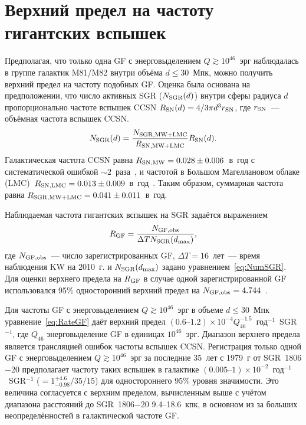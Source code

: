 \section{Верхний предел на частоту гигантских вспышек}\label{GF_rate}
Предполагая, что только одна GF с энерговыделением $Q \gtrsim 10^{46}$~эрг наблюдалась 
в группе галактик M81/M82 внутри объёма $d \le 30$~Мпк, можно получить верхний предел 
на частоту подобных GF. Оценка была основана на предположении, что число активных SGR ($N_{\mathrm{SGR}}(d)$) 
внутри сферы радиуса $d$ пропорционально частоте вспышек CCSN 
$R_{\mathrm{SN}}(d)=4/3 \pi d^3 r_{\mathrm{SN}}$, где $r_{\mathrm{SN}}$~--- объёмная частота вспышек CCSN.
\begin{equation}\label{eq:NumSGR}
N_{{\mathrm{SGR}}} (d) = \frac{N_{{\mathrm{SGR}}, {\mathrm{MW+LMC}}}}{ R_{{\mathrm{SN}}, {\mathrm{MW+LMC}}}} R_{{\mathrm{SN}}}(d).
\end{equation}
Галактическая частота CCSN равна $R_{{\mathrm{SN}}, {\mathrm{MW}}} = 0.028\pm0.006$~в~год 
с систематической ошибкой $\sim 2$~раза~\citep{Li2011part3}, и частотой в Большом 
Магеллановом облаке (LMC)~$R_{{\mathrm{SN}}, {\mathrm{LMC}}} = 0.013\pm0.009$~в~год~\citep{Bergh1991}. 
Таким образом, суммарная частота равна $R_{{\mathrm{SGR}}, {\mathrm{MW+LMC}}} = 0.041\pm0.011$~в~год. 


Наблюдаемая частота гигантских вспышек на SGR задаётся выражением
\begin{equation}\label{eq:RateGF}
R_{{\mathrm{GF}}} = \frac{N_{{\mathrm{GF}},{\mathrm{obs}}}}{\Delta T N_{{\mathrm{SGR}}}(d_{{\mathrm{max}}})} ,
\end{equation}
где $N_{{\mathrm{GF}},{\mathrm{obs}}}$~--- число зарегистрированных GF, 
$\Delta T=16$~лет~--- время наблюдения KW на 2010~г. и $N_{{\mathrm{SGR}}}(d_{{\mathrm{max}}})$ 
задано уравнением~\ref{eq:NumSGR}. Для оценки верхнего предела на $R_{{\mathrm{GF}}}$ 
в случае одной зарегистрированной GF использовался 95\% односторонний верхний предел
на $N_{{\mathrm{GF}}, {\mathrm{obs}}}=4.744$~\citep{Gehrels1986}.

Для частоты GF с энерговыделением $Q \gtrsim 10^{46}$~эрг в объеме $d\le30$~Мпк уравнение~\ref{eq:RateGF} 
даёт верхний предел ${(0.6\textrm{--}1.2)\times 10^{-4} Q_{46}^{-1.5}}$~год$^{-1}$~SGR$^{-1}$, 
где $Q_{46}$ энерговыделение GF в единицах $10^{46}$~эрг. Диапазон верхнего предела 
является трансляцией ошибок частоты вспышек CCSN. Регистрация только 
одной GF с энерговыделением $Q \gtrsim 10^{46}$~эрг за последние 35~лет 
с 1979~г от SGR~1806$-$20 предполагает частоту таких вспышек в галактике 
${(0.005\textrm{--}1)\times 10^{-2}}$~год$^{-1}$~SGR$^{-1}$ ($=1_{-0.98}^{+4.6} / 35 / 15 $) 
для одностороннего 95\% уровня значимости. Это величина согласуется с верхним пределом, 
вычисленным выше с учётом диапазона расстояний до SGR~1806$-$20 9.4--18.6~кпк, 
в основном из за больших неопределённостей в галактической частоте GF. 

